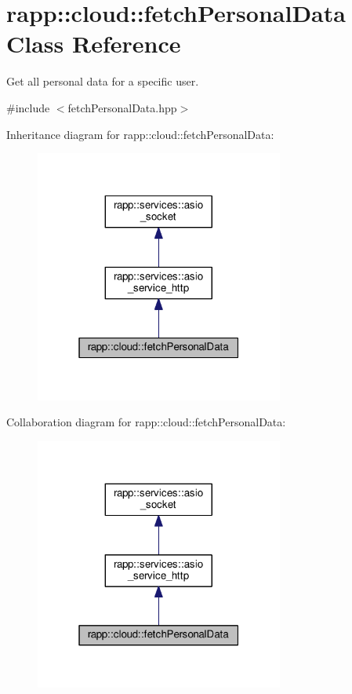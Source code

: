 \hypertarget{classrapp_1_1cloud_1_1fetchPersonalData}{\section{rapp\-:\-:cloud\-:\-:fetch\-Personal\-Data Class Reference}
\label{classrapp_1_1cloud_1_1fetchPersonalData}
}


Get all personal data for a specific user.  




{\ttfamily \#include $<$fetch\-Personal\-Data.\-hpp$>$}



Inheritance diagram for rapp\-:\-:cloud\-:\-:fetch\-Personal\-Data\-:
\nopagebreak
\begin{figure}[H]
\begin{center}
\leavevmode
\includegraphics[width=232pt]{classrapp_1_1cloud_1_1fetchPersonalData__inherit__graph}
\end{center}
\end{figure}


Collaboration diagram for rapp\-:\-:cloud\-:\-:fetch\-Personal\-Data\-:
\nopagebreak
\begin{figure}[H]
\begin{center}
\leavevmode
\includegraphics[width=232pt]{classrapp_1_1cloud_1_1fetchPersonalData__coll__graph}
\end{center}
\end{figure}
